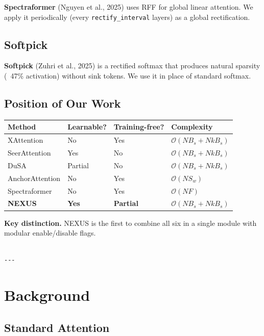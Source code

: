 \textbf{Spectraformer} (Nguyen et al., 2025) uses RFF for global linear attention. 
We apply it periodically (every \texttt{rectify\_interval} layers) as a global 
rectification.

\subsection{Softpick}

\textbf{Softpick} (Zuhri et al., 2025) is a rectified softmax that produces 
natural sparsity (~47\% activation) without sink tokens. We use it in place 
of standard softmax.

\subsection{Position of Our Work}

\begin{table}[H]
\centering
\small
\begin{tabular}{llll}
\toprule
\textbf{Method} & \textbf{Learnable?} & \textbf{Training-free?} & \textbf{Complexity} \\
\midrule
XAttention & No & Yes & $\mathcal{O}(N B_s + N k B_s)$ \\
SeerAttention & Yes & No & $\mathcal{O}(N B_s + N k B_s)$ \\
DuSA & Partial & No & $\mathcal{O}(N B_s + N k B_s)$ \\
AnchorAttention & No & Yes & $\mathcal{O}(N S_w)$ \\
Spectraformer & No & Yes & $\mathcal{O}(N F)$ \\
\textbf{NEXUS} & \textbf{Yes} & \textbf{Partial} & \textbf{$\mathcal{O}(N B_s + N k B_s)$} \\
\bottomrule
\end{tabular}
\end{table}

\textbf{Key distinction.} NEXUS is the first to combine all six in a single 
module with modular enable/disable flags.
\begin{lstlisting}

---
\end{lstlisting}

\section{Background}

\subsection{Standard Attention}

